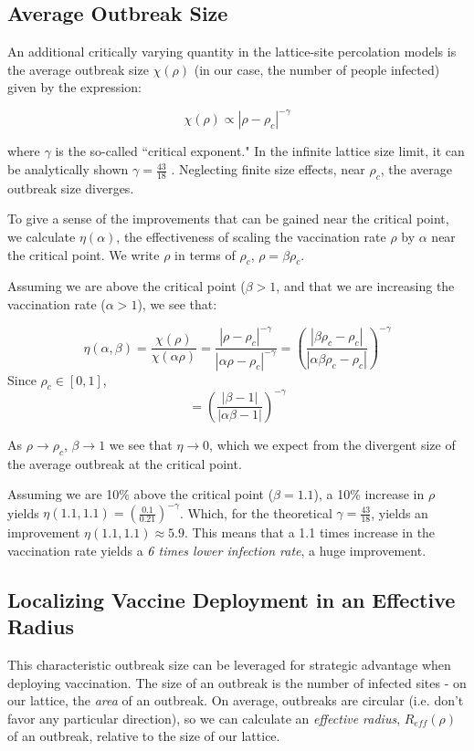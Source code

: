 \documentclass{article}
\begin{document}
\subsection{Average Outbreak Size}

An additional critically varying quantity in the lattice-site percolation models is the average outbreak size $\chi(\rho)$ (in our case, the number of people infected) given by the expression:

$$\chi(\rho) \propto |\rho - \rho_c|^{-\gamma}$$ 

where $\gamma$ is the so-called ``critical exponent." In the infinite lattice size limit, it can be analytically shown $\gamma = \frac{43}{18}$ \cite{Christensen2005}. Neglecting finite size effects, near $\rho_c$, the average outbreak size diverges. 

To give a sense of the improvements that can be gained near the critical point, we calculate $\eta(\alpha)$, the effectiveness of scaling the vaccination rate $\rho$ by $\alpha$ near the critical point. We write $\rho$ in terms of $\rho_c$, $\rho = \beta \rho_c$.

Assuming we are above the critical point ($\beta > 1$, and that we are increasing the vaccination rate ($\alpha > 1$), we see that:

$$
\eta(\alpha, \beta) = \frac{\chi(\rho)}{\chi(\alpha \rho)}
= \frac{|\rho - \rho_c|^{-\gamma}}{|\alpha\rho - \rho_c|^{-\gamma}}
= 
\left(\frac{|\beta\rho_c - \rho_c|}{|\alpha\beta\rho_c - \rho_c|}\right)^{-\gamma}
$$
Since $\rho_c \in [0,1]$,
$$
=
\left(\frac{|\beta - 1|}{|\alpha\beta - 1|}\right)^{-\gamma}
$$

As $\rho \rightarrow \rho_c$, $\beta \rightarrow 1$ we see that $\eta \rightarrow 0$, which we expect from the divergent size of the average outbreak at the critical point.

Assuming we are 10\% above the critical point ($\beta = 1.1$), a 10\% increase in $\rho$ yields $\eta(1.1, 1.1) = \left(\frac{0.1}{0.21}\right)^{-\gamma}$. Which, for the theoretical $\gamma = \frac{43}{18}$, yields an improvement $\eta(1.1, 1.1) \approx 5.9$. This means that a 1.1 times increase in the vaccination rate yields a \textit{6 times lower infection rate}, a huge improvement.

\subsection{Localizing Vaccine Deployment in an Effective Radius}

This characteristic outbreak size can be leveraged for strategic advantage when deploying vaccination. The size of an outbreak is the number of infected sites - on our lattice, the \textit{area} of an outbreak. On average, outbreaks are circular (i.e. don't favor any particular direction), so we can calculate an \textit{effective radius}, $R_{eff}(\rho)$ of an outbreak, relative to the size of our lattice.
\end{document}
